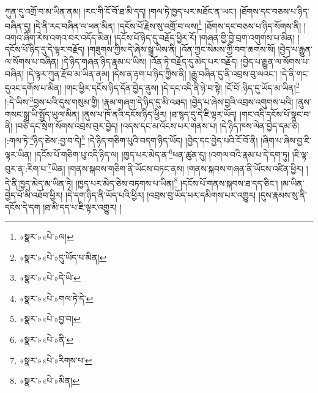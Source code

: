 ཀུན་དུ་འགྲོ་བ་མ་ཡིན་ནམ། །རང་གི་ངོ་བོ་ཐ་མི་དད། །གལ་ཏེ་ཁྱད་པར་མཐོང་ན་ཡང་། །ཐོགས་དང་བཅས་པ་ཉིད་བཞིན་དུ། །དེ་ནི་རང་བཞིན་ལ་ཕན་མིན། །དངོས་པོ་རྗེས་སུ་འགྲོ་བ་ལས།\footnote{«སྣར་»«པེ་»ལ།} །ཐོགས་དང་བཅས་པ་ཉིད་སོགས་ནི། །འགའ་ཞིག་རེས་འགའ་བར་འདོད་མིན། །དངོས་པོ་ཉིད་དུ་བརྗོད་ཕྱིར་རོ། །གཞན་གྱི་བྱེ་བྲག་འགུགས་པ་མིན། །དངོས་པོ་ཉིད་དུ་དེ་ལྟར་བརྗོད། །གཟུགས་ཀྱིས་དེ་ཞེས་སྒྲ་ཡིས་ནི། །འོན་ཀྱང་སེམས་ཀྱི་བག་ཆགས་སོ། །བྱེད་པ་རྒྱུན་ལ་སོགས་པ་བཞིན། །དེ་ཉིད་གཞན་ཉིད་རྣམ་པ་ཡིས། །འོན་ཏེ་བརྗོད་དུ་མེད་པར་བརྗོད། །བྱེད་པ་རྒྱུན་ལ་སོགས་པ་བཞིན། །དེ་ལྟར་ཀུན་རྫོབ་མ་ཡིན་ནམ། །དེས་ན་རྟག་པ་ཉིད་ཀྱིས་ནི། །རྒྱུ་བཞིན་དུ་ནི་འབྲས་བུ་ལའང་། །དེ་ནི་གང་དུའང་དགོས་པ་མིན། །གང་ཕྱིར་དངོས་ཉིད་དོན་བྱེད་ནུས། །དེ་དང་འདི་ནི་ཉེ་བ་སྟེ། །ངོ་བོ་:ཉིད་དུ་ཡོད་མ་ཡིན།\footnote{«སྣར་»«པེ་»དུ་ཡོད་པ་མིན།} །:དེ་ཡིས་\footnote{«སྣར་»«པེ་»དེ་ཡི་}བྱས་པའི་དུས་གསུམ་གྱི། །རྣམ་གཞག་དེ་ཉིད་དུ་མི་འཐད། །བྱེད་པ་ཞེས་བྱའི་འབྲས་འགུགས་པའི། །ནུས་གསང་སྒྲ་ཡི་སྤྱོད་ཡུལ་མིན། །ནུས་པ་ཁོ་ནའི་དངོས་ཉིད་ཕྱིར། །ཐ་སྙད་དུ་དེ་ཇི་ལྟར་ཡོད། །གང་འདི་དངོས་པོ་སྣང་བ་ནི། །བཙོ་དང་སྲེག་སོགས་འབྲས་བུར་བྱེད། །འདས་དང་མ་འོངས་པར་གནས་པ། །དེ་ཉིད་ཁས་ལེན་བྱེད་དམ་ཅི། །:གལ་ཏེ་\footnote{«སྣར་»«པེ་»གལ་ཏེ་དེ་}ཉིད་ཅེས་:བྱ་བ་དེ།\footnote{«སྣར་»«པེ་»བྱ་བ།} །དེ་ཉིད་གཅིག་པུའི་བདག་ཉིད་ཡོད། །བྱེད་དང་བྱེད་པའི་ངོ་བོ་ནི། །ཞིག་པ་ཞེས་བྱ་ཇི་ལྟར་ཡིན། །དངོས་པོ་གཅིག་པུ་འདི་ཉིད་ལ། །ཁྱད་པར་མེད་ན་\footnote{«སྣར་»«པེ་»ནི་}ཕན་ཚུན་དུ། །འགལ་བའི་རྣམ་པ་དེ་དག་ཏུ། །ཇི་ལྟ་བུར་ན་:རིག་པ་\footnote{«སྣར་»«པེ་»རིགས་པ་}ཡིན། །གནས་སྐབས་གཅིག་ནི་ཡོངས་བཏང་ནས། །གནས་སྐབས་གཞན་ནི་ཡོངས་འཛིན་ཕྱིར། །དེ་ནི་ཁྱད་མེད་མ་ཡིན་ཏེ། །ཁྱད་པར་མེད་ཅེས་བཏགས་པ་ཡིན།\footnote{«སྣར་»«པེ་»མིན།} །དངོས་པོ་གནས་སྐབས་ཐ་དད་ཅིང་། །མ་ཡིན་བྱེད་པོ་མི་འཐོབ་ཕྱིར། །དེ་དག་ཉིད་ནི་ཡོད་པའི་ཕྱིར། །འབྲས་བུ་ཡོད་པར་དམིགས་པར་འགྱུར། །དུས་རྣམས་སུ་ནི་དངོས་དེ་དག །ཐ་མི་དད་པ་ཇི་ལྟར་འགྱུར། །
